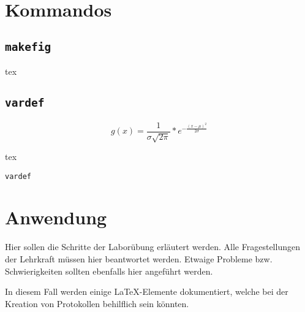 \newpage
\section{Kommandos}\label{sec:Kommandos}
\subsection{\texttt{makefig}}

\begin{code}{tex}
\end{code}

\subsection{\texttt{vardef}}
$$g(x) = \frac{1}{\sigma\sqrt{2\pi}} * e^{-\frac{(x-\mu)^2}{2\sigma}}$$
\begin{listing}[H]
\begin{code}[firstnumber=last]{tex}
\begin{vardefs}
\end{vardefs}
\end{code}
\caption{\texttt{vardef}}
\label{lst:vardef}
\end{listing}

\begin{vardefs}
\end{vardefs}

\newpage
\section{Anwendung}\label{sec:Anwendung}
Hier sollen die Schritte der Laborübung erläutert werden. Alle Fragestellungen der Lehrkraft müssen hier beantwortet werden. Etwaige Probleme bzw. Schwierigkeiten sollten ebenfalls hier angeführt werden.

In diesem Fall werden einige \LaTeX-Elemente dokumentiert, welche bei der Kreation von Protokollen behilflich sein könnten.

